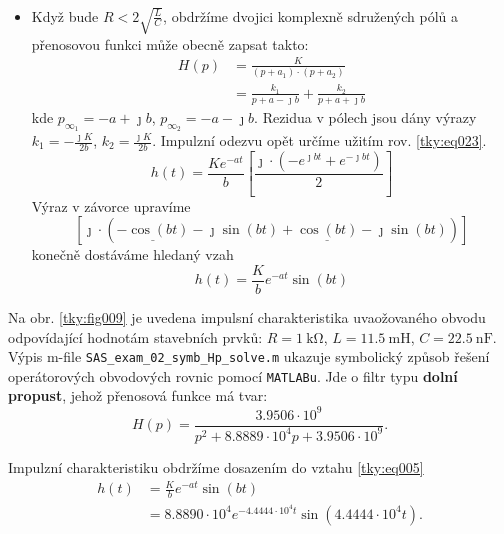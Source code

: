 \begin{tkyexam}
\begin{itemize}[leftmargin=12pt,noitemsep]
\begin{align*}
          \end{align*}
    \item Když bude $R<2\sqrt{\frac{L}{C}}$, obdržíme dvojici komplexně sdružených pólů a
          přenosovou funkci může obecně zapsat takto:
          \begin{align*}
            H(p)&=\frac{K}{(p+a_1)\cdot(p+a_2)}            \\
                &=\frac{k_1}{p+a-\jmath b}+\frac{k_2}{p+a+\jmath b}
          \end{align*}
          kde $p_{\infty_1}=-a+\jmath b$, $p_{\infty_2}=-a-\jmath b$. Rezidua v pólech jsou dány
          výrazy $k_1=-\frac{\jmath K}{2b}$, $k_2=\frac{\jmath K}{2b}$. Impulzní odezvu opět
          určíme užitím rov. \ref{tky:eq023}.
          \begin{equation*}
            h(t) = \frac{Ke^{-at}}{b}
                    \left[\dfrac{\jmath\cdot\left(-e^{\jmath bt}+e^{-\jmath bt}\right)}{2}\right]
          \end{equation*}
          Výraz v závorce upravíme
          \begin{equation*}
            \left[\jmath\cdot\left(\underline{-\cos(bt)}-\jmath\sin(bt) + 
                                    \underline{\cos(bt)} -\jmath\sin(bt)
                              \right)
            \right]                                                     
          \end{equation*}
          konečně dostáváme hledaný vzah
          \begin{equation*}              
            h(t) = \frac{K}{b}e^{-at}\sin(bt)                                   
          \end{equation*}
  \end{itemize}
  
  Na obr. \ref{tky:fig009} je uvedena impulsní charakteristika uvaožovaného obvodu odpovídající
  hodnotám stavebních prvků: \(R=\SI{1}{\kohm}\), \(L=\SI{11.5}{\milli\henry}\),
  \(C=\SI{22.5}{\nano\farad}\). Výpis m-file \texttt{SAS\_exam\_02\_symb\_Hp\_solve.m} ukazuje
  symbolický způsob řešení operátorových obvodových rovnic pomocí \texttt{MATLABu}. Jde o filtr typu
  \textbf{dolní propust}, jehož přenosová funkce má tvar:
  $$H(p)= \frac{3.9506\cdot10^9}{p^2+8.8889\cdot10^4p+3.9506\cdot10^9}.$$

  Impulzní charakteristiku obdržíme dosazením do vztahu \ref{tky:eq005}
  \begin{align*}
    h(t)&=\frac{K}{b}e^{-at}\sin(bt)                                      \\
        &=8.8890\cdot10^4e^{-4.4444\cdot10^4t}\sin(4.4444\cdot10^4t).
  \end{align*}
      

\end{tkyexam}
